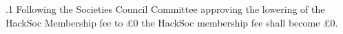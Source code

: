 .1 Following the Societies Council Committee approving the lowering of the HackSoc Membership fee to \pounds0 the HackSoc membership fee shall become \pounds0.\ \\
